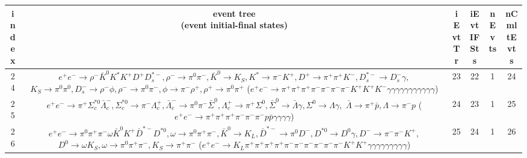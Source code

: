 \documentclass[landscape]{article}
\begin{document}
\begin{table}[htbp!]
\small
\centering
\begin{tabular}{|c|c|c|c|c|c|}
\hline
index & \thead{event tree \\ (event initial-final states)} & iEvtTr & iEvtIFSts & nEvts & nCmltEvts \\
\hline
24 & \makecell{ $ 
e^{+} e^{-} \rightarrow \rho^{-} \bar{K}^{0} K^{*} K^{+} D^{+} D_{s}^{*-} ,
\rho^{-} \rightarrow \pi^{0} \pi^{-} ,
\bar{K}^{0} \rightarrow K_{S} ,
K^{*} \rightarrow \pi^{-} K^{+} ,
D^{+} \rightarrow \pi^{+} \pi^{+} K^{-} ,
D_{s}^{*-} \rightarrow D_{s}^{-} \gamma ,
$ \\ $
K_{S} \rightarrow \pi^{0} \pi^{0} ,
D_{s}^{-} \rightarrow \rho^{-} \phi ,
\rho^{-} \rightarrow \pi^{0} \pi^{-} ,
\phi \rightarrow \pi^{-} \rho^{+} ,
\rho^{+} \rightarrow \pi^{0} \pi^{+} 
$ \\ ($
e^{+} e^{-} \rightarrow \pi^{+} \pi^{+} \pi^{+} \pi^{-} \pi^{-} \pi^{-} \pi^{-} K^{+} K^{+} K^{-} \gamma \gamma \gamma \gamma \gamma \gamma \gamma \gamma \gamma \gamma \gamma 
$) } & 23 & 22 & 1 & 24 \\
\hline
25 & \makecell{ $ 
e^{+} e^{-} \rightarrow \pi^{+} \Sigma_{c}^{*0} \bar{\Lambda}_{c}^{-} ,
\Sigma_{c}^{*0} \rightarrow \pi^{-} \Lambda_{c}^{+} ,
\bar{\Lambda}_{c}^{-} \rightarrow \pi^{0} \pi^{-} \bar{\Sigma}^{0} ,
\Lambda_{c}^{+} \rightarrow \pi^{+} \Sigma^{0} ,
\bar{\Sigma}^{0} \rightarrow \bar{\Lambda} \gamma ,
\Sigma^{0} \rightarrow \Lambda \gamma ,
$ \\ $
\bar{\Lambda} \rightarrow \pi^{+} \bar{p} ,
\Lambda \rightarrow \pi^{-} p 
$ \\ ($
e^{+} e^{-} \rightarrow \pi^{+} \pi^{+} \pi^{+} \pi^{-} \pi^{-} \pi^{-} p \bar{p} \gamma \gamma \gamma \gamma 
$) } & 24 & 23 & 1 & 25 \\
\hline
26 & \makecell{ $ 
e^{+} e^{-} \rightarrow \pi^{0} \pi^{+} \pi^{-} \omega \bar{K}^{0} K^{+} \bar{D}^{*-} D^{*0} ,
\omega \rightarrow \pi^{0} \pi^{+} \pi^{-} ,
\bar{K}^{0} \rightarrow K_{L} ,
\bar{D}^{*-} \rightarrow \pi^{0} D^{-} ,
D^{*0} \rightarrow D^{0} \gamma ,
D^{-} \rightarrow \pi^{-} \pi^{-} K^{+} ,
$ \\ $
D^{0} \rightarrow \omega K_{S} ,
\omega \rightarrow \pi^{0} \pi^{+} \pi^{-} ,
K_{S} \rightarrow \pi^{+} \pi^{-} 
$ \\ ($
e^{+} e^{-} \rightarrow K_{L} \pi^{+} \pi^{+} \pi^{+} \pi^{+} \pi^{-} \pi^{-} \pi^{-} \pi^{-} \pi^{-} \pi^{-} K^{+} K^{+} \gamma \gamma \gamma \gamma \gamma \gamma \gamma \gamma \gamma 
$) } & 25 & 24 & 1 & 26 \\

\end{tabular}
\end{table}
\end{document}
